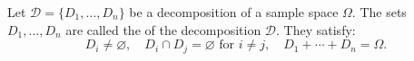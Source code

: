Let $\mathcal{D} = \{D_1, \ldots, D_n\}$ be a decomposition of a sample space $\Omega$. The sets $D_1, \ldots, D_n$ are called the  of the decomposition $\mathcal{D}$. They satisfy:
$$D_i \neq \varnothing, \quad D_i \cap D_j = \varnothing \text{ for } i \neq j, \quad D_1 + \cdots + D_n = \Omega.$$
